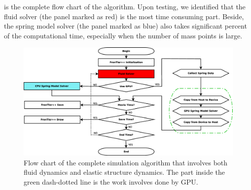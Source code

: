  is the complete flow chart of the algorithm.
Upon testing, we identified that the fluid solver (the panel marked as red)
is the most time consuming part.
Beside, the spring model solver (the panel marked as blue) also takes
significant percent of the computational time, especially when the number of
mass points is large.
\begin{figure}[!ht]
\centering
\includegraphics[width=1.0\textwidth]{figures/flowchart}
\caption{Flow chart of the complete simulation algorithm that involves
both fluid dynamics and elastic structure dynamics. The part inside the green
dash-dotted line is the work involves done by GPU.}
\label{fig:sm_flow_chart}
\end{figure}

